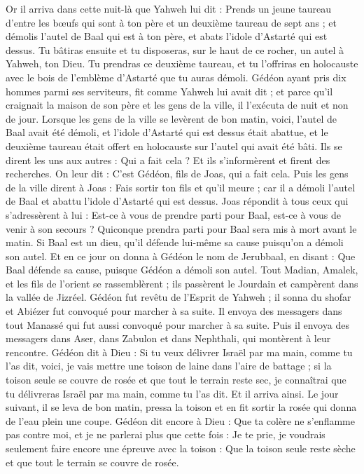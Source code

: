 \begin{multicols}{2}
Or il arriva dans cette nuit-là que Yahweh lui dit : Prends un jeune taureau d'entre les bœufs qui sont à ton père et un deuxième taureau de sept ans ; et démolis l'autel de Baal qui est à ton père, et abats l'idole d'Astarté qui est dessus.
Tu bâtiras ensuite et tu disposeras, sur le haut de ce rocher, un autel à Yahweh, ton Dieu. Tu prendras ce deuxième taureau, et tu l'offriras en holocauste avec le bois de l'emblème d'Astarté que tu auras démoli.
Gédéon ayant pris dix hommes parmi ses serviteurs, fit comme Yahweh lui avait dit ; et parce qu'il craignait la maison de son père et les gens de la ville, il l'exécuta de nuit et non de jour.
Lorsque les gens de la ville se levèrent de bon matin, voici, l'autel de Baal avait été démoli, et l'idole d'Astarté qui est dessus était abattue, et le deuxième taureau était offert en holocauste sur l'autel qui avait été bâti.
Ils se dirent les uns aux autres : Qui a fait cela ? Et ils s'informèrent et firent des recherches. On leur dit : C'est Gédéon, fils de Joas, qui a fait cela.
Puis les gens de la ville dirent à Joas : Fais sortir ton fils et qu'il meure ; car il a démoli l'autel de Baal et abattu l'idole d'Astarté qui est dessus.
Joas répondit à tous ceux qui s'adressèrent à lui : Est-ce à vous de prendre parti pour Baal, est-ce à vous de venir à son secours ? Quiconque prendra parti pour Baal sera mis à mort avant le matin. Si Baal est un dieu, qu'il défende lui-même sa cause puisqu'on a démoli son autel.
Et en ce jour on donna à Gédéon le nom de Jerubbaal, en disant : Que Baal défende sa cause, puisque Gédéon a démoli son autel.
Tout Madian, Amalek, et les fils de l'orient se rassemblèrent ; ils passèrent le Jourdain et campèrent dans la vallée de Jizréel.
Gédéon fut revêtu de l'Esprit de Yahweh ; il sonna du shofar et Abiézer fut convoqué pour marcher à sa suite.
Il envoya des messagers dans tout Manassé qui fut aussi convoqué pour marcher à sa suite. Puis il envoya des messagers dans Aser, dans Zabulon et dans Nephthali, qui montèrent à leur rencontre.
Gédéon dit à Dieu : Si tu veux délivrer Israël par ma main, comme tu l'as dit,
voici, je vais mettre une toison de laine dans l'aire de battage ; si la toison seule se couvre de rosée et que tout le terrain reste sec, je connaîtrai que tu délivreras Israël par ma main, comme tu l'as dit.
Et il arriva ainsi. Le jour suivant, il se leva de bon matin, pressa la toison et en fit sortir la rosée qui donna de l'eau plein une coupe.
Gédéon dit encore à Dieu : Que ta colère ne s'enflamme pas contre moi, et je ne parlerai plus que cette fois : Je te prie, je voudrais seulement faire encore une épreuve avec la toison : Que la toison seule reste sèche et que tout le terrain se couvre de rosée.

\end{multicols}
